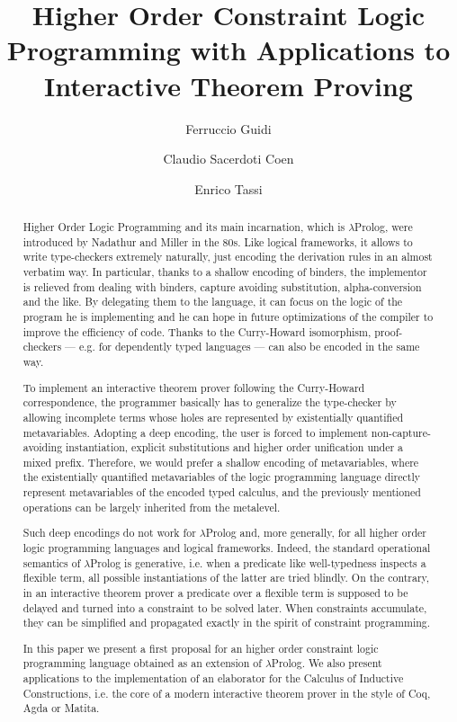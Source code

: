 \documentclass{easychair}
\title{Higher Order Constraint Logic Programming with Applications to Interactive Theorem Proving}
\author{Ferruccio Guidi \and Claudio Sacerdoti Coen \and Enrico Tassi}
\institute{
  Department of Computer Science, University of Bologna \email{...} \and
  Department of Computer Science, University of Bologna \email{...} \and
  Inria Sophia-Antipolis, \email{Enrico.Tassi@inria.fr}}
\begin{document}
\maketitle

\begin{abstract}
Higher Order Logic Programming and its main incarnation, which is $\lambda$Prolog, were introduced by Nadathur and Miller in the 80s. Like logical frameworks, it allows to write type-checkers extremely naturally, just encoding the derivation rules in an almost verbatim way. In particular, thanks to a shallow encoding of binders, the implementor is relieved from dealing with binders, capture avoiding substitution, alpha-conversion and the like. By delegating them to the language, it can focus on the logic of the program he is implementing and he can hope in future optimizations of the compiler to improve the efficiency of code. Thanks to the Curry-Howard isomorphism, proof-checkers --- e.g. for dependently typed languages --- can also be encoded in the same way.

To implement an interactive theorem prover following the Curry-Howard correspondence, the programmer basically has to generalize the type-checker by allowing incomplete terms whose holes are represented by existentially quantified metavariables. Adopting a deep encoding, the user is forced to implement non-capture-avoiding instantiation, explicit substitutions and higher order unification under a mixed prefix. Therefore, we would prefer a shallow encoding of metavariables, where the existentially quantified metavariables of the logic programming language directly represent metavariables of the encoded typed calculus, and the previously mentioned operations can be largely inherited from the metalevel.

Such deep encodings do not work for $\lambda$Prolog and, more generally, for all higher order logic programming languages and logical frameworks. Indeed, the standard operational semantics of $\lambda$Prolog is generative, i.e. when a predicate like well-typedness inspects a flexible term, all possible instantiations of the latter are tried blindly. On the contrary, in an interactive theorem prover a predicate over a flexible term is supposed to be delayed and turned into a constraint to be solved later. When constraints accumulate, they can be simplified and propagated exactly in the spirit of constraint programming.

In this paper we present a first proposal for an higher order constraint logic
programming language obtained as an extension of $\lambda$Prolog. We also present
applications to the implementation of an elaborator for the Calculus of
Inductive Constructions, i.e. the core of a modern interactive theorem prover
in the style of Coq, Agda or Matita.
\end{abstract}
\end{document}
